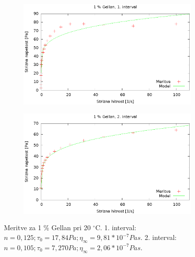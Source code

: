 \documentclass{article}
\begin{document}
\begin{figure}
	\centering
	\begin{subfigure}[b]{0.4\textwidth}
	       \includegraphics[width=\textwidth]{tok_gel1.eps}
	   \end{subfigure}
	   \begin{subfigure}[b]{0.4\textwidth}
	       \includegraphics[width=\textwidth]{tok_gel2.eps}
	   \end{subfigure}
	\caption{Meritve za 1 \% Gellan pri 20 $^\circ$C. 1. interval: $n = 0,125; \tau_0 = 17,84 Pa; \eta_\infty = 9,81*10^{-7} Pa s$. 2. interval: $n = 0,105; \tau_0 = 7,270 Pa; \eta_\infty = 2,06*10^{-7} Pa s$.}
	\label{fig:tok_gel1}
\end{figure}
\end{document}
